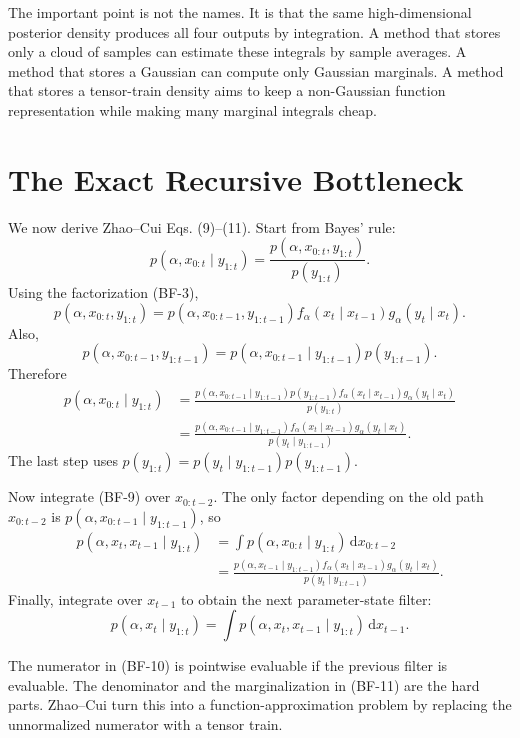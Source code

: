 \documentclass[11pt]{article}
\newcommand{\dd}{\,\mathrm d}
\begin{document}
The important point is not the names.  It is that the same high-dimensional
posterior density produces all four outputs by integration.  A method that
stores only a cloud of samples can estimate these integrals by sample averages.
A method that stores a Gaussian can compute only Gaussian marginals.  A method
that stores a tensor-train density aims to keep a non-Gaussian function
representation while making many marginal integrals cheap.

\section{The Exact Recursive Bottleneck}

We now derive Zhao--Cui Eqs. (9)--(11).  Start from Bayes' rule:
\[
 p(\alpha,x_{0:t}\mid y_{1:t})
 =
 \frac{p(\alpha,x_{0:t},y_{1:t})}{p(y_{1:t})}.
\]
Using the factorization (BF-3),
\[
 p(\alpha,x_{0:t},y_{1:t})
 =
 p(\alpha,x_{0:t-1},y_{1:t-1})
 f_\alpha(x_t\mid x_{t-1})g_\alpha(y_t\mid x_t).
\]
Also,
\[
 p(\alpha,x_{0:t-1},y_{1:t-1})
 =
 p(\alpha,x_{0:t-1}\mid y_{1:t-1})p(y_{1:t-1}).
\]
Therefore
\[
\begin{aligned}
 p(\alpha,x_{0:t}\mid y_{1:t})
 &=
 \frac{
 p(\alpha,x_{0:t-1}\mid y_{1:t-1})p(y_{1:t-1})
 f_\alpha(x_t\mid x_{t-1})g_\alpha(y_t\mid x_t)}
 {p(y_{1:t})}\\
 &=
 \frac{
 p(\alpha,x_{0:t-1}\mid y_{1:t-1})
 f_\alpha(x_t\mid x_{t-1})g_\alpha(y_t\mid x_t)}
 {p(y_t\mid y_{1:t-1})}.
\end{aligned}
\tag{BF-9}
\]
The last step uses \(p(y_{1:t})=p(y_t\mid y_{1:t-1})p(y_{1:t-1})\).

Now integrate (BF-9) over \(x_{0:t-2}\).  The only factor depending on the old
path \(x_{0:t-2}\) is
\(p(\alpha,x_{0:t-1}\mid y_{1:t-1})\), so
\[
\begin{aligned}
 p(\alpha,x_t,x_{t-1}\mid y_{1:t})
 &=
 \int p(\alpha,x_{0:t}\mid y_{1:t})\dd x_{0:t-2}\\
 &=
 \frac{
 p(\alpha,x_{t-1}\mid y_{1:t-1})
 f_\alpha(x_t\mid x_{t-1})g_\alpha(y_t\mid x_t)}
 {p(y_t\mid y_{1:t-1})}.
\end{aligned}
\tag{BF-10}
\]
Finally, integrate over \(x_{t-1}\) to obtain the next parameter-state filter:
\[
    p(\alpha,x_t\mid y_{1:t})
    =
    \int p(\alpha,x_t,x_{t-1}\mid y_{1:t})\dd x_{t-1}.
    \tag{BF-11}
\]

The numerator in (BF-10) is pointwise evaluable if the previous filter is
evaluable.  The denominator and the marginalization in (BF-11) are the hard
parts.  Zhao--Cui turn this into a function-approximation problem by replacing
the unnormalized numerator with a tensor train.
\end{document}
